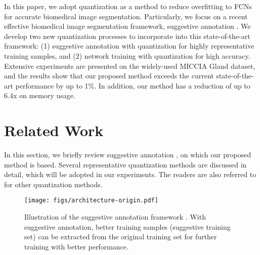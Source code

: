 \documentclass[10pt,twocolumn,letterpaper]{article}
\begin{document}
In this paper, we adopt quantization as a method to reduce overfitting to FCNs for accurate biomedical image segmentation.
Particularly, we focus on a recent effective biomedical image segmentation framework, suggestive annotation \cite{yang2017suggestive}.
We develop two new quantization processes to incorporate into this state-of-the-art framework: (1) suggestive annotation with quantization for highly representative training samples, and (2) network training with quantization for high accuracy.
Extensive experiments are presented on the widely-used MICCIA Gland dataset, and the results show that our proposed method exceeds the current state-of-the-art performance by up to 1\%.
In addition, our method has a reduction of up to 6.4x on memory usage.


\section{Related Work}
In this section, we briefly review suggestive annotation \cite{yang2017suggestive}, on which our proposed method is based.
Several representative quantization methods are discussed in detail, which will be adopted in our experiments.
The readers are also referred to \cite{han2015deep,courbariaux2015binaryconnect,rastegari2016xnor} for other quantization methods.

\begin{figure}
\begin{center}
\centerline{\texttt{[image: figs/architecture-origin.pdf]}}
\end{center}
\vspace{-20pt}
   \caption{Illustration of the suggestive annotation framework \cite{yang2017suggestive}. With suggestive annotation, better training samples (suggestive training set) can be extracted from the original training set for further training with better performance.}
\label{fig:architectureOrigin}
\end{figure}
\end{document}
